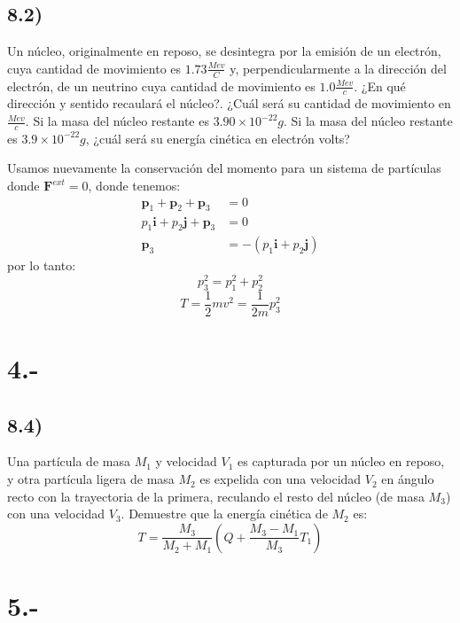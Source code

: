 \documentclass{article}
\begin{document}
\subsection*{8.2)}
Un núcleo, originalmente en reposo, se desintegra por la emisión de un electrón, cuya 
cantidad de movimiento es $1.73 \frac{Mev}{C}$ y, perpendicularmente a la dirección del
electrón, de un neutrino cuya cantidad de movimiento es $1.0\frac{Mev}{c}$. ¿En qué dirección y 
sentido recaulará el núcleo?. ¿Cuál será su cantidad de movimiento en $\frac{Mev}{c}$. 
Si la masa del núcleo restante es $3.90 \times 10^{-22}g$. Si la masa del núcleo restante es 
$3.9 \times 10^{-22}g$, ¿cuál será su energía cinética en electrón volts? 
\begin{tcolorbox}[breakable]
    Usamos nuevamente la conservación del momento para un sistema de partículas donde $\bm{F}^{ext} = 0$, donde tenemos:
    \begin{align*}
        \bm{p}_1 + \bm{p}_2 + \bm{p}_3 &= 0 \\
        p_1\bm{i} + p_2\bm{j} + \bm{p}_3 &= 0 \\
        \bm{p}_3 &= -(p_1\bm{i} + p_2\bm{j})
    \end{align*}
    por lo tanto:
    \[ p_3^2 = p_1^2 + p_2^2 \]
    \[ T = \frac{1}{2}mv^2 = \frac{1}{2m}p_3^2 \]
\end{tcolorbox}

\section*{4.-}
\subsection*{8.4)}
Una partícula de masa $M_1$ y velocidad $V_1$ es capturada por un núcleo en reposo,
y otra partícula ligera de masa $M_2$ es expelida con una velocidad $V_2$ en ángulo 
recto con la trayectoria de la primera, reculando el resto del núcleo (de masa $M_3$)
con una velocidad $V_3$. Demuestre que la energía cinética de $M_2$ es:
\[ T = \frac{M_3}{M_2+M_1} \left( Q + \frac{M_3-M_1}{M_3}T_1 \right) \]
\begin{tcolorbox}[breakable]
\end{tcolorbox}

\section*{5.-}
\end{document}
